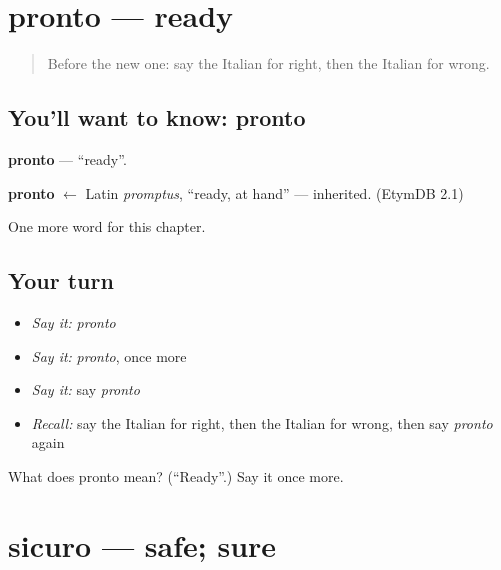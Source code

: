 \section[pronto]{pronto — ready}

\label{lesson:IT-C127-pronto}



\begin{quote}
Before the new one: say the Italian for right, then the Italian for wrong.
\end{quote}

\subsection*{You'll want to know: pronto}
\textbf{pronto} — \textquotedblleft{}ready\textquotedblright{}.

\begin{cousinweb}
\textbf{pronto} $\leftarrow$ Latin \emph{promptus}, \textquotedblleft{}ready, at hand\textquotedblright{} — inherited. (EtymDB 2.1)
\end{cousinweb}

\begin{grammarlens}[title={What you've built}]
One more word for this chapter.
\end{grammarlens}

\subsection*{Your turn}
\begin{itemize}
\raggedright
  \item \emph{Say it:} \emph{pronto}
  \item \emph{Say it:} \emph{pronto}, once more
  \item \emph{Say it:} say \emph{pronto}
  \item \emph{Recall:} say the Italian for right, then the Italian for wrong, then say \emph{pronto} again
\end{itemize}

\begin{tcolorbox}[breakable,colback=teal!4,colframe=teal!35!black,title={Before you move on}]
What does pronto mean? (\textquotedblleft{}Ready\textquotedblright{}.) Say it once more.
\end{tcolorbox}
\section[sicuro]{sicuro — safe; sure}

